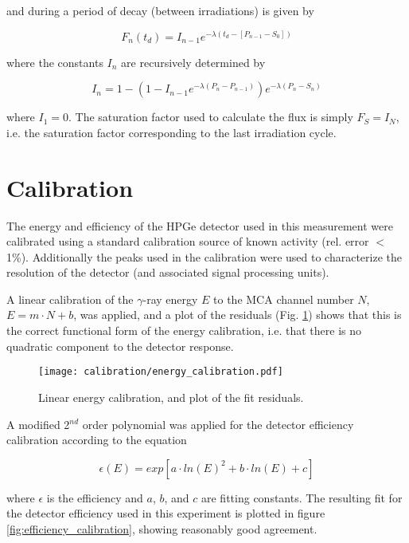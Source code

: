 \documentclass[aps,twocolumn,secnumarabic,balancelastpage,amsmath,amssymb,nofootinbib,floatfix]{revtex4-1}
\begin{document}
and during a period of decay (between irradiations) is given by

\begin{equation}
F_n(t_d) = I_{n-1}e^{-\lambda (t_d-[P_{n-1}-S_0])}
\end{equation}

where the constants $I_n$ are recursively determined by 

\begin{equation}
I_n = 1-(1-I_{n-1}e^{-\lambda (P_n-P_{n-1})})e^{-\lambda (P_n-S_n)}
\end{equation}

where $I_1=0$.  The saturation factor used to calculate the flux is simply $F_S=I_N$, i.e. the saturation factor corresponding to the last irradiation cycle.


\section{Calibration}
The energy and efficiency of the HPGe detector used in this measurement were calibrated using a standard calibration source of known activity (rel. error $<$1\%).  Additionally the peaks used in the calibration were used to characterize the resolution of the detector (and associated signal processing units).

A linear calibration of the $\gamma$-ray energy $E$ to the MCA channel number $N$, $E = m\cdot N+b$, was applied, and a plot of the residuals (Fig. \ref{fig:energy_calibration}) shows that this is the correct functional form of the energy calibration, i.e. that there is no quadratic component to the detector response.

\begin{figure}[htb]
\texttt{[image: calibration/energy\_calibration.pdf]}
\caption{Linear energy calibration, and plot of the fit residuals.
}
\label{fig:energy_calibration}
\end{figure}

A modified 2$^{nd}$ order polynomial was applied for the detector efficiency calibration according to the equation

\begin{equation}
\epsilon (E) = exp[a\cdot ln(E)^2+b\cdot ln(E)+c]
\end{equation}

where $\epsilon$ is the efficiency and $a$, $b$, and $c$ are fitting constants.  The resulting fit for the detector efficiency used in this experiment is plotted in figure \ref{fig:efficiency_calibration}, showing reasonably good agreement.
\end{document}
